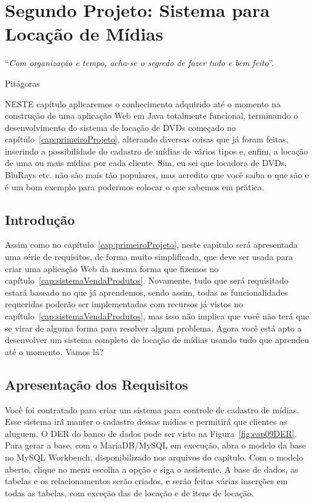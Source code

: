\chapter{Segundo Projeto: Sistema para Locação de Mídias}\label{cap:segundoProjeto}
\epigraph{``\textit{Com organização e tempo, acha-se o segredo de fazer tudo e bem feito}''.}{Pitágoras}

\lettrine[lines=4, lhang=0.1, lraise=0, loversize=0.2, findent=0.1em]{\textcolor{corTema}{N}}{ESTE} capítulo aplicaremos o conhecimento adquirido até o momento na construção de uma aplicação Web em Java totalmente funcional, terminando o desenvolvimento do sistema de locação de DVDs começado no capítulo~\ref{cap:primeiroProjeto}, alterando diversas coisas que já foram feitas, inserindo a possibilidade do cadastro de mídias de vários tipos e, enfim, a locação de uma ou mais mídias por cada cliente. Sim, eu sei que locadora de DVDs, BluRays etc. não são mais tão populares, mas acredito que você saiba o que são e é um bom exemplo para podermos colocar o que sabemos em prática.


\section{Introdução}

Assim como no capítulo~\ref{cap:primeiroProjeto}, neste capítulo será apresentada uma série de requisitos, de forma muito simplificada, que deve ser usada para criar uma aplicação Web da mesma forma que fizemos no capítulo~\ref{cap:sistemaVendaProdutos}. Novamente, tudo que será requisitado estará baseado no que já aprendemos, sendo assim, todas as funcionalidades requeridas poderão ser implementadas com recursos já vistos no capítulo~\ref{cap:sistemaVendaProdutos}, mas isso não implica que você não terá que se virar de alguma forma para resolver algum problema. Agora você está apto a desenvolver um sistema completo de locação de mídias usando tudo que aprendeu até o momento. Vamos lá?


\section{Apresentação dos Requisitos}

Você foi contratado para criar um sistema para controle de cadastro de mídias. Esse sistema irá manter o cadastro dessas mídias e permitirá que clientes as aluguem. O DER do banco de dados pode ser visto na Figura~\ref{fig:cap09DER}. Para gerar a base, com o MariaDB/MySQL em execução, abra o modelo da base no MySQL Workbench, disponibilizado nos arquivos do capítulo. Com o modelo aberto, clique no menu  escolha a opção  e siga o assistente. A base de dados, as tabelas e os relacionamentos serão criados, e serão feitas várias inserções em todas as tabelas, com exceção das de locação e de itens de locação.

